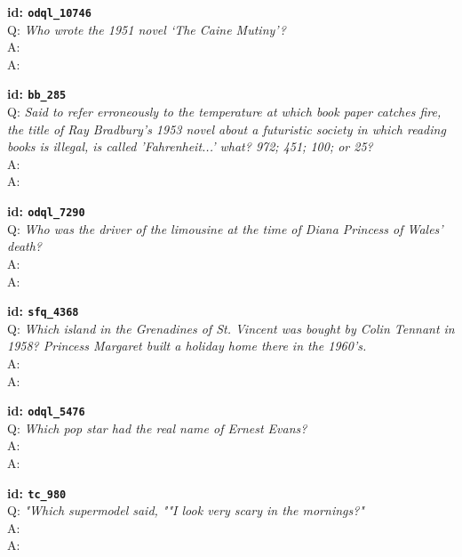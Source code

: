 \tiny{\setlength{\parindent}{0cm}
\textbf{id: \texttt{odql\_10746}} \\
Q: \textit{Who wrote the 1951 novel ‘The Caine Mutiny’?} \\
A:  \\
A: }

\tiny{\setlength{\parindent}{0cm}
\textbf{id: \texttt{bb\_285}} \\
Q: \textit{Said to refer erroneously to the temperature at which book paper catches fire, the title of Ray Bradbury's 1953 novel about a futuristic society in which reading books is illegal, is called 'Fahrenheit...' what? 972; 451; 100; or 25?} \\
A:  \\
A: }

\tiny{\setlength{\parindent}{0cm}
\textbf{id: \texttt{odql\_7290}} \\
Q: \textit{Who was the driver of the limousine at the time of Diana Princess of Wales' death?} \\
A:  \\
A: }

\tiny{\setlength{\parindent}{0cm}
\textbf{id: \texttt{sfq\_4368}} \\
Q: \textit{Which island in the Grenadines of St. Vincent was bought by Colin Tennant in 1958? Princess Margaret built a holiday home there in the 1960's.} \\
A:  \\
A: }

\tiny{\setlength{\parindent}{0cm}
\textbf{id: \texttt{odql\_5476}} \\
Q: \textit{Which pop star had the real name of Ernest Evans?} \\
A:  \\
A: }

\tiny{\setlength{\parindent}{0cm}
\textbf{id: \texttt{tc\_980}} \\
Q: \textit{"Which supermodel said, ""I look very scary in the mornings?"} \\
A:  \\
A: }
